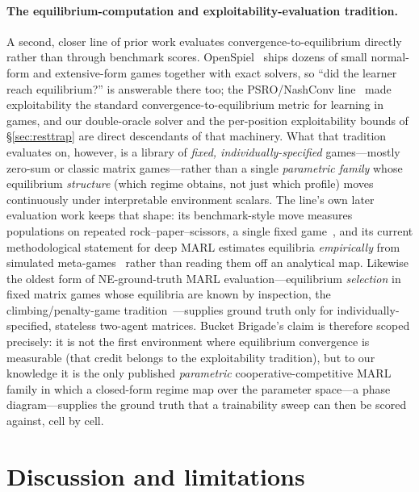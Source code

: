 \documentclass{anvil-paper}
\begin{document}
\paragraph{The equilibrium-computation and exploitability-evaluation
tradition.} A second, closer line of prior work evaluates
convergence-to-equilibrium directly rather than through benchmark
scores. OpenSpiel~\citep{openspiel2019} ships dozens of small
normal-form and extensive-form games together with exact solvers, so
``did the learner reach equilibrium?'' is answerable there too; the
PSRO/NashConv line~\citep{psro2017} made exploitability the standard
convergence-to-equilibrium metric for learning in games, and our
double-oracle solver and the per-position exploitability bounds of
\S\ref{sec:resttrap} are direct descendants of that machinery. What
that tradition evaluates on, however, is a library of \emph{fixed,
individually-specified} games---mostly zero-sum or classic matrix
games---rather than a single \emph{parametric family} whose
equilibrium \emph{structure} (which regime obtains, not just which
profile) moves continuously under interpretable environment scalars.
The line's own later evaluation work keeps that shape: its
benchmark-style move measures populations on repeated
rock--paper--scissors, a single fixed
game~\citep{lanctot2023population}, and its current methodological
statement for deep MARL estimates equilibria \emph{empirically} from
simulated meta-games~\citep{li2024meta} rather than reading them off
an analytical map. Likewise the oldest form of NE-ground-truth MARL
evaluation---equilibrium \emph{selection} in fixed matrix games whose
equilibria are known by inspection, the climbing/penalty-game
tradition~\citep{christianos2022pareto}---supplies ground truth only
for individually-specified, stateless two-agent matrices.
Bucket Brigade's claim is therefore scoped precisely: it is not the
first environment where equilibrium convergence is measurable (that
credit belongs to the exploitability tradition), but to our knowledge
it is the only published \emph{parametric} cooperative-competitive
MARL family in which a closed-form regime map over the parameter
space---a phase diagram---supplies the ground truth that a trainability
sweep can then be scored against, cell by cell.

\section{Discussion and limitations}
\label{sec:discussion}
\end{document}
